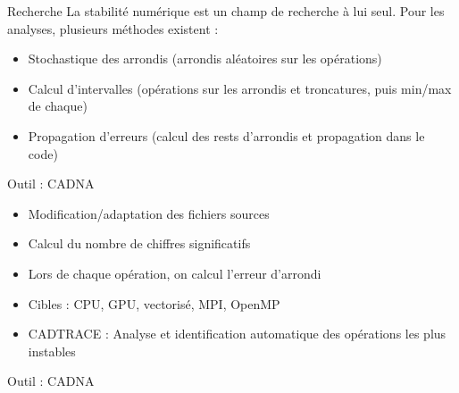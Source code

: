 \documentclass{beamer}
\begin{document}
  
  \begin{frame}{Recherche}
La stabilité numérique est un champ de recherche à lui seul. Pour les analyses, plusieurs méthodes existent : 
\begin{itemize}
\item Stochastique des arrondis (arrondis aléatoires sur les opérations)
\item Calcul d'intervalles (opérations sur les arrondis et troncatures, puis min/max de chaque)
\item Propagation d'erreurs (calcul des rests d'arrondis et propagation dans le code)
\end{itemize}
  \end{frame}  
  
    \begin{frame}{Outil : CADNA}
    \begin{itemize}
    \item Modification/adaptation des fichiers sources
    \item Calcul du nombre de chiffres significatifs
    \item Lors de chaque opération, on calcul l'erreur d'arrondi
    \item Cibles : CPU, GPU, vectorisé, MPI, OpenMP
    \item CADTRACE : Analyse et identification automatique des opérations les plus instables
    \end{itemize}
  \end{frame}
  
  
  \begin{frame}{Outil : CADNA}
\cadnanosample
  \end{frame}
  
\end{document}
